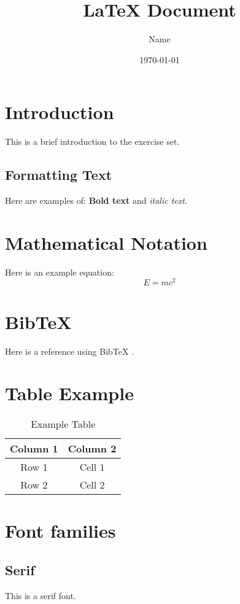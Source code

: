 \documentclass{article}
\title{LaTeX Document}
\author{Name}
\date{\today}
\begin{document}
\maketitle

\tableofcontents

\section{Introduction}
This is a brief introduction to the exercise set.

\subsection{Formatting Text}
Here are examples of: \textbf{Bold text} and \textit{italic text}.

\section{Mathematical Notation}
Here is an example equation:
\begin{equation}
    E = mc^2
\end{equation}

\section{BibTeX}
Here is a reference using BibTeX \citep{lamport1994latex}.

\section{Table Example}
\begin{table}[h]
    \centering
    \begin{tabular}{|c|c|}
        \hline
        Column 1 & Column 2 \\
        \hline
        Row 1 & Cell 1\\
        Row 2 & Cell 2\\
        \hline
    \end{tabular}
    \caption{Example Table}
    \label{tab:example}
\end{table}

\section{Font families}
\subsection{Serif}
This is a serif font.
\end{document}
